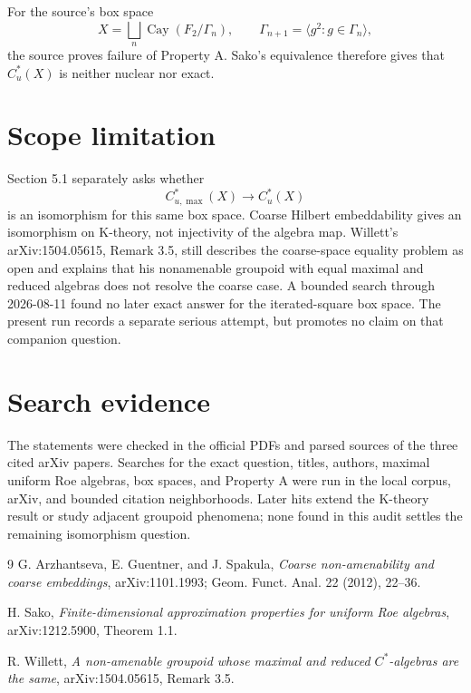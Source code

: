 \documentclass[11pt]{article}
\begin{document}
For the source's box space
\[
 X=\bigsqcup_n \operatorname{Cay}(F_2/\Gamma_n),\qquad
 \Gamma_{n+1}=\langle g^2:g\in\Gamma_n\rangle,
\]
the source proves failure of Property A.  Sako's equivalence therefore gives
that $C_u^*(X)$ is neither nuclear nor exact.

\section*{Scope limitation}

Section 5.1 separately asks whether
\[
 C^*_{u,\max}(X)\longrightarrow C_u^*(X)
\]
is an isomorphism for this same box space.  Coarse Hilbert embeddability gives
an isomorphism on K-theory, not injectivity of the algebra map.  Willett's
arXiv:1504.05615, Remark 3.5, still describes the coarse-space equality
problem as open and explains that his nonamenable groupoid with equal maximal
and reduced algebras does not resolve the coarse case.  A bounded search
through 2026-08-11 found no later exact answer for the iterated-square box
space.  The present run records a separate serious attempt, but promotes no
claim on that companion question.

\section*{Search evidence}

The statements were checked in the official PDFs and parsed sources of the
three cited arXiv papers.  Searches for the exact question, titles, authors,
maximal uniform Roe algebras, box spaces, and Property A were run in the local
corpus, arXiv, and bounded citation neighborhoods.  Later
hits extend the K-theory result or study adjacent groupoid phenomena; none
found in this audit settles the remaining isomorphism question.

\begin{thebibliography}{9}
G. Arzhantseva, E. Guentner, and J. Spakula,
\emph{Coarse non-amenability and coarse embeddings},
arXiv:1101.1993; Geom. Funct. Anal. 22 (2012), 22--36.

H. Sako,
\emph{Finite-dimensional approximation properties for uniform Roe algebras},
arXiv:1212.5900, Theorem 1.1.

R. Willett,
\emph{A non-amenable groupoid whose maximal and reduced $C^*$-algebras are
the same}, arXiv:1504.05615, Remark 3.5.
\end{thebibliography}
\end{document}
